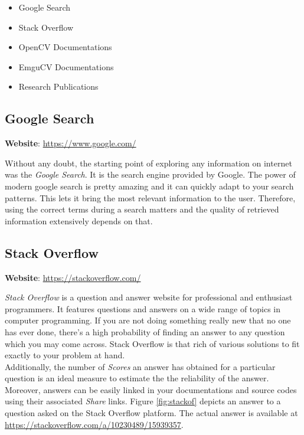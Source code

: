 \documentclass[a4paper,12pt]{report}%
\begin{document}
\begin{itemize}
	\item Google Search 
	\item Stack Overflow 
	\item OpenCV Documentations 
	\item EmguCV Documentations 
	\item Research Publications
\end{itemize}

\subsection{Google Search}

\textbf{Website}: \url{https://www.google.com/}

Without any doubt, the starting point of exploring any information on internet was the \textit{Google Search}.  It is the search engine provided by Google. The power of modern google search is pretty amazing and it can quickly adapt to your search patterns. This lets it bring the most relevant information to the user. Therefore, using the correct terms during a search matters and the quality of retrieved information extensively depends on that.

\subsection{Stack Overflow}

\textbf{Website}: \url{https://stackoverflow.com/}

\textit{Stack Overflow} is a question and answer website for professional and enthusiast programmers. It features questions and answers on a wide range of topics in computer programming\cite{stackoverflow}. If you are not doing something really new that no one has ever done, there's a high probability of finding an answer to any question which you may come across. Stack Overflow is that rich of various solutions to fit exactly to your problem at hand.\\

Additionally, the number of \textit{Scores} an answer has obtained for a particular question is an ideal measure to estimate the the reliability of the answer. Moreover, answers can be easily linked in your documentations and source codes using their associated \textit{Share} links. Figure \ref{fig:stackof} depicts an answer to a question asked on the Stack Overflow platform. The actual answer is available at \url{https://stackoverflow.com/a/10230489/15939357}.
\end{document}

